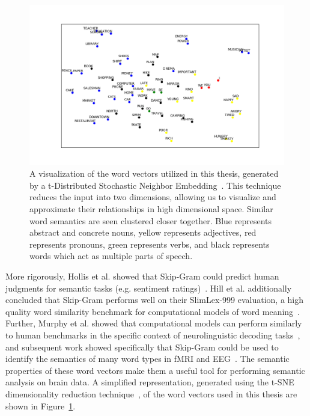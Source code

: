 \begin{figure}[t]
 \centerline{
   \includegraphics[width=\linewidth]{figures/tsne}
 }
 \caption[Visualization of Utilized Word Vectors]{
   A visualization of the word vectors utilized in this thesis, generated by a 
   t-Distributed Stochastic Neighbor Embedding~\cite{maaten2008visualizing}.  
   This technique reduces the input into two dimensions, allowing us to 
   visualize and approximate their relationships in high dimensional space.  
   Similar word semantics are seen clustered closer together. Blue represents 
   abstract and concrete nouns, yellow represents adjectives, red represents 
   pronouns, green represents verbs, and black represents words which act as 
   multiple parts of speech.
 }
 \label{fig:tsne}
\end{figure}

More rigorously, Hollis et al. showed that Skip-Gram could predict human 
judgments for semantic tasks (e.g. sentiment 
ratings)~\cite{hollis2017extrapolating}.  Hill et al.  additionally concluded 
that Skip-Gram performs well on their SlimLex-999 evaluation, a high quality 
word similarity benchmark for computational models of word 
meaning~\cite{hill2016simlex}. Further, Murphy et al. showed that computational 
models can perform similarly to human benchmarks in the specific context of 
neurolinguistic decoding tasks~\cite{Murphy2012}, and subsequent work showed 
specifically that Skip-Gram could be used to identify the semantics of many 
word types in fMRI and EEG~\cite{xu2016brainbench}. The semantic properties of 
these word vectors make them a useful tool for performing semantic analysis on 
brain data. A simplified representation, generated using the t-SNE 
dimensionality reduction technique~\cite{maaten2008visualizing}, of the word 
vectors used in this thesis are shown in Figure~\ref{fig:tsne}.

